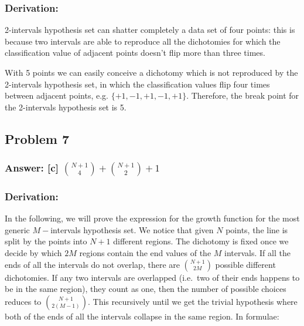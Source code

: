 \documentclass[11pt]{article}
\begin{document}
\hypertarget{derivation}{%
\subsubsection{Derivation:}\label{derivation}}

2-intervals hypothesis set can shatter completely a data set of four
points: this is because two intervals are able to reproduce all the
dichotomies for which the classification value of adjacent points
doesn't flip more than three times.

With 5 points we can easily conceive a dichotomy which is not reproduced
by the 2-intervals hypothesis set, in which the classification values
flip four times between adjacent points, e.g. \(\{+1,-1,+1,-1,+1\}\).
Therefore, the break point for the 2-intervals hypothesis set is 5.

    \hypertarget{problem-7}{%
\subsection{Problem 7}\label{problem-7}}

\hypertarget{answer-c-n1choose4n1choose21}{%
\subsubsection{\texorpdfstring{Answer: {[}c{]}
\({N+1\choose4}+{N+1\choose2}+1\)}{Answer: {[}c{]} \{N+1\textbackslash{}choose4\}+\{N+1\textbackslash{}choose2\}+1}}\label{answer-c-n1choose4n1choose21}}

\hypertarget{derivation}{%
\subsubsection{Derivation:}\label{derivation}}

In the following, we will prove the expression for the growth function
for the most generic \(M-\)intervals hypothesis set. We notice that
given \(N\) points, the line is split by the points into \(N+1\)
different regions. The dichotomy is fixed once we decide by which \(2M\)
regions contain the end values of the \(M\) intervals. If all the ends
of all the intervals do not overlap, there are \(N+1\choose2M\) possible
different dichotomies. If any two intervals are overlapped (i.e.~two of
their ends happens to be in the same region), they count as one, then
the number of possible choices reduces to \(N+1\choose2(M-1)\). This
recursively until we get the trivial hypothesis where both of the ends
of all the intervals collapse in the same region. In formulae:
\end{document}

